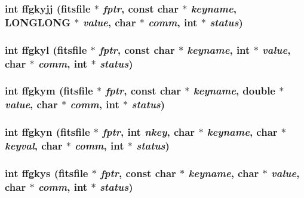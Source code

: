 \subsubsection{\setlength{\rightskip}{0pt plus 5cm}int ffgkyjj (\bf{fitsfile} $\ast$ {\em fptr}, const char $\ast$ {\em keyname}, \bf{LONGLONG} $\ast$ {\em value}, char $\ast$ {\em comm}, int $\ast$ {\em status})}\label{src_2fitsio_8h_6ad49eda5b9e0d9b57def9abc3f60fe5}


\subsubsection{\setlength{\rightskip}{0pt plus 5cm}int ffgkyl (\bf{fitsfile} $\ast$ {\em fptr}, const char $\ast$ {\em keyname}, int $\ast$ {\em value}, char $\ast$ {\em comm}, int $\ast$ {\em status})}\label{src_2fitsio_8h_514f9731bc6c8ba190dccd5d4744f841}


\subsubsection{\setlength{\rightskip}{0pt plus 5cm}int ffgkym (\bf{fitsfile} $\ast$ {\em fptr}, const char $\ast$ {\em keyname}, double $\ast$ {\em value}, char $\ast$ {\em comm}, int $\ast$ {\em status})}\label{src_2fitsio_8h_8e2c807fdca3339d4789efea6f71f64a}


\subsubsection{\setlength{\rightskip}{0pt plus 5cm}int ffgkyn (\bf{fitsfile} $\ast$ {\em fptr}, int {\em nkey}, char $\ast$ {\em keyname}, char $\ast$ {\em keyval}, char $\ast$ {\em comm}, int $\ast$ {\em status})}\label{src_2fitsio_8h_767eade3619fc0d0f2642f25121b2f70}


\subsubsection{\setlength{\rightskip}{0pt plus 5cm}int ffgkys (\bf{fitsfile} $\ast$ {\em fptr}, const char $\ast$ {\em keyname}, char $\ast$ {\em value}, char $\ast$ {\em comm}, int $\ast$ {\em status})}\label{src_2fitsio_8h_556303d192d9b46c3fa0950d058f6245}



